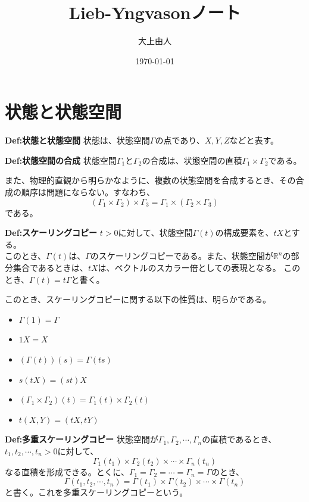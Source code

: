 \documentclass[a4paper,11pt]{jsarticle}
\begin{document}
\title{Lieb-Yngvasonノート}
\author{大上由人}
\date{\today}
\maketitle
\tableofcontents
\newpage
\section{状態と状態空間}
\begin{itembox}[l]{\textbf{Def:状態と状態空間}}
状態は、状態空間$\Gamma$の点であり、$X,Y,Z$などと表す。
\end{itembox}

\begin{itembox}[l]{\textbf{Def:状態空間の合成}}
    状態空間$\Gamma_1$と$\Gamma_2$の合成は、状態空間の直積$\Gamma_1 \times \Gamma_2$である。
\end{itembox}
また、物理的直観から明らかなように、複数の状態空間を合成するとき、その合成の順序は問題にならない。すなわち、
\begin{equation}
    (\Gamma_1 \times \Gamma_2) \times \Gamma_3 = \Gamma_1 \times (\Gamma_2 \times \Gamma_3)
\end{equation}
である。

\begin{itembox}[l]{\textbf{Def:スケーリングコピー}}
    $t>0$に対して、状態空間$\Gamma(t)$の構成要素を、$tX$とする。\\
    このとき、$\Gamma(t)$は、$\Gamma$のスケーリングコピーである。また、状態空間が$\mathbb{R}^n$の部分集合であるときは、$tX$は、ベクトルのスカラー倍としての表現となる。
    このとき、$\Gamma(t)=t\Gamma$と書く。
\end{itembox}
このとき、スケーリングコピーに関する以下の性質は、明らかである。
\begin{itemize}
    \item $\Gamma(1)=\Gamma$
    \item $1X=X$
    \item $(\Gamma(t))(s)=\Gamma(ts)$
    \item $s(tX)=(st)X$
    \item $(\Gamma_1 \times \Gamma_2)(t)=\Gamma_1(t) \times \Gamma_2(t)$
    \item $t(X,Y)=(tX,tY)$
\end{itemize}

\begin{itembox}[l]{\textbf{Def:多重スケーリングコピー}}
    状態空間が$\Gamma_1,\Gamma_2,\cdots,\Gamma_n$の直積であるとき、$t_1,t_2,\cdots,t_n>0$に対して、
    \begin{equation}
        \Gamma_1(t_1) \times \Gamma_2(t_2) \times \cdots \times \Gamma_n(t_n)
    \end{equation}
    なる直積を形成できる。とくに、$\Gamma_1=\Gamma_2=\cdots=\Gamma_n=\Gamma$のとき、
    \begin{equation}
        \Gamma(t_1,t_2,\cdots,t_n)=\Gamma(t_1) \times \Gamma(t_2) \times \cdots \times \Gamma(t_n)
    \end{equation}
    と書く。これを多重スケーリングコピーという。
\end{itembox}
\end{document}
